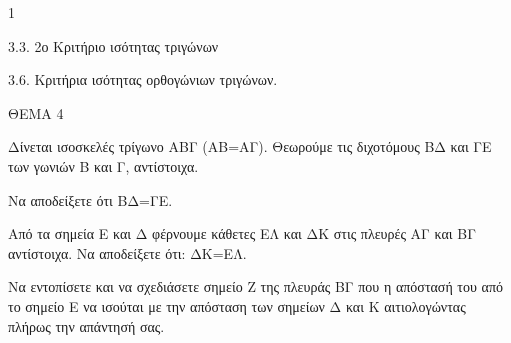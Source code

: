 \begin{ylh}{1}
    \item 3.3. 2ο Κριτήριο ισότητας τριγώνων
    \item 3.6. Κριτήρια ισότητας ορθογώνιων τριγώνων.
\end{ylh}

ΘΕΜΑ 4

Δίνεται ισοσκελές τρίγωνο ΑΒΓ (ΑΒ=ΑΓ). Θεωρούμε τις διχοτόμους ΒΔ και ΓΕ των γωνιών Β και Γ, αντίστοιχα.

\begin{alist}
\item Να αποδείξετε ότι ΒΔ=ΓΕ. 

\item Από τα σημεία Ε και Δ φέρνουμε κάθετες ΕΛ και ΔΚ στις πλευρές ΑΓ και ΒΓ αντίστοιχα. Να αποδείξετε ότι: ΔΚ=ΕΛ. 

\item Να εντοπίσετε και να σχεδιάσετε σημείο Ζ της πλευράς ΒΓ που η απόστασή του από το σημείο Ε να ισούται με την απόσταση των σημείων Δ και Κ αιτιολογώντας πλήρως την απάντησή σας. 


\end{alist}
